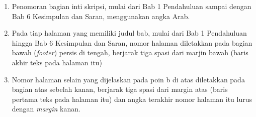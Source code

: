 \documentclass[
  indonesian,
  letterpaper,
]{scrbook}
\providecommand{\tightlist}{%
  \setlength{\itemsep}{0pt}\setlength{\parskip}{0pt}}
\begin{document}
\begin{enumerate}
\def\labelenumi{\alph{enumi}.}
\tightlist
\item
  Penomoran bagian inti skripsi, mulai dari Bab 1 Pendahuluan sampai
  dengan Bab 6 Kesimpulan dan Saran, menggunakan angka Arab.
\item
  Pada tiap halaman yang memiliki judul bab, mulai dari Bab 1
  Pendahuluan hingga Bab 6 Kesimpulan dan Saran, nomor halaman
  diletakkan pada bagian bawah (\emph{footer}) persis di tengah,
  berjarak tiga spasi dari marjin bawah (baris akhir teks pada halaman
  itu)
\item
  Nomor halaman selain yang dijelaskan pada poin b di atas diletakkan
  pada bagian atas sebelah kanan, berjarak tiga spasi dari margin atas
  (baris pertama teks pada halaman itu) dan angka terakhir nomor halaman
  itu lurus dengan \emph{margin} kanan.
\end{enumerate}


\backmatter
\end{document}
